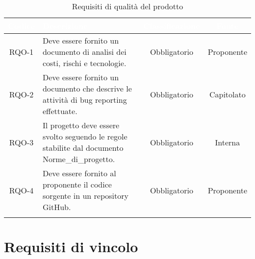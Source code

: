 \begingroup
\setlength{\tabcolsep}{10pt}
\renewcommand{\arraystretch}{1.5}
\begin{xltabular}{\textwidth}{| c | X | c | c |}
    \hline
     \textbf{\textcolor{white}{Codice}} & \textbf{\textcolor{white}{Descrizione}} & \textbf{\textcolor{white}{Classificazione}} & \textbf{\textcolor{white}{Fonte}}\\
    \hline
    \endhead
    RQO-1 & Deve essere fornito un documento di analisi dei costi, rischi e tecnologie. & Obbligatorio & Proponente \\
    \hline
    RQO-2 & Deve essere fornito un documento che descrive le attività di bug reporting effettuate. & Obbligatorio & Capitolato \\
    \hline
    RQO-3 & Il progetto deve essere svolto seguendo le regole stabilite dal documento Norme\_di\_progetto. & Obbligatorio & Interna \\
    \hline
    RQO-4 & Deve essere fornito al proponente il codice sorgente in un repository GitHub. & Obbligatorio & Proponente \\
    \hline
     \caption{Requisiti di qualità del prodotto}
    \label{tab:reqqua}
\end{xltabular}
\endgroup

\section{Requisiti di vincolo}

